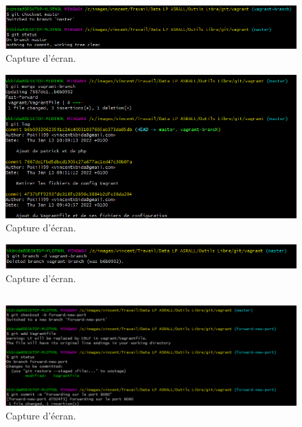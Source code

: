 \documentclass{article}
\begin{document}
\begin{figure}[h]
\centering
\includegraphics[width=\textwidth]{images/q3-2-5.png}
\caption{\label{fig:frog}Capture d'écran.}
\end{figure}

\begin{figure}[h]
\centering
\includegraphics[width=\textwidth]{images/q3-2-6.png}
\caption{\label{fig:frog}Capture d'écran.}
\end{figure}

\begin{figure}[h]
\centering
\includegraphics[width=\textwidth]{images/q3-2-7.png}
\caption{\label{fig:frog}Capture d'écran.}
\end{figure}
\FloatBarrier
\subsection{}

\begin{figure}[h]
\centering
\includegraphics[width=\textwidth]{images/q3-3-1.png}
\caption{\label{fig:frog}Capture d'écran.}
\end{figure}
\end{document}
